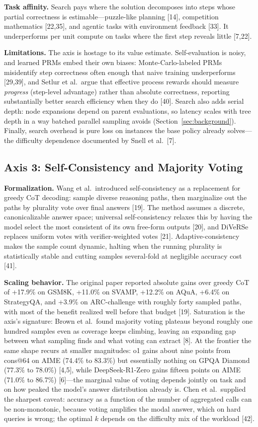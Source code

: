 \documentclass[10pt]{article}
\begin{document}
\textbf{Task affinity.} Search pays where the solution decomposes into steps whose partial correctness is estimable---puzzle-like planning [14], competition mathematics [22,35], and agentic tasks with environment feedback [33]. It underperforms per unit compute on tasks where the first step reveals little [7,22].

\textbf{Limitations.} The axis is hostage to its value estimate. Self-evaluation is noisy, and learned PRMs embed their own biases: Monte-Carlo-labeled PRMs misidentify step correctness often enough that naive training underperforms [29,39], and Setlur et al.\ argue that effective process rewards should measure \emph{progress} (step-level advantage) rather than absolute correctness, reporting substantially better search efficiency when they do [40]. Search also adds serial depth: node expansions depend on parent evaluations, so latency scales with tree depth in a way batched parallel sampling avoids (Section~\ref{sec:background}). Finally, search overhead is pure loss on instances the base policy already solves---the difficulty dependence documented by Snell et al.\ [7].

\subsection{Axis 3: Self-Consistency and Majority Voting}
\label{sec:axis3}

\textbf{Formalization.} Wang et al.\ introduced self-consistency as a replacement for greedy CoT decoding: sample diverse reasoning paths, then marginalize out the paths by plurality vote over final answers [19]. The method assumes a discrete, canonicalizable answer space; universal self-consistency relaxes this by having the model select the most consistent of its own free-form outputs [20], and DiVeRSe replaces uniform votes with verifier-weighted votes [21]. Adaptive-consistency makes the sample count dynamic, halting when the running plurality is statistically stable and cutting samples several-fold at negligible accuracy cost [41].

\textbf{Scaling behavior.} The original paper reported absolute gains over greedy CoT of +17.9\% on GSM8K, +11.0\% on SVAMP, +12.2\% on AQuA, +6.4\% on StrategyQA, and +3.9\% on ARC-challenge with roughly forty sampled paths, with most of the benefit realized well before that budget [19]. Saturation is the axis's signature: Brown et al.\ found majority voting plateaus beyond roughly one hundred samples even as coverage keeps climbing, leaving an expanding gap between what sampling finds and what voting can extract [8]. At the frontier the same shape recurs at smaller magnitudes: o1 gains about nine points from cons@64 on AIME (74.4\% to 83.3\%) but essentially nothing on GPQA Diamond (77.3\% to 78.0\%) [4,5], while DeepSeek-R1-Zero gains fifteen points on AIME (71.0\% to 86.7\%) [6]---the marginal value of voting depends jointly on task and on how peaked the model's answer distribution already is. Chen et al.\ supplied the sharpest caveat: accuracy as a function of the number of aggregated calls can be non-monotonic, because voting amplifies the modal answer, which on hard queries is wrong; the optimal $k$ depends on the difficulty mix of the workload [42].
\end{document}
